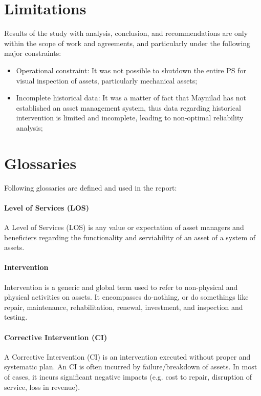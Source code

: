 \section{Limitations}
Results of the study with analysis, conclusion, and recommendations are only within the scope of work and agreements, and particularly under the following major constraints:
\begin{itemize}
\item Operational constraint: It was not possible to shutdown the entire PS for visual inspection of assets, particularly mechanical assets;
\item Incomplete historical data: It was a matter of fact that Maynilad has not established an asset management system, thus data regarding historical intervention is limited and incomplete, leading to non-optimal reliability analysis; 
\end{itemize}



\section{Glossaries}
Following glossaries are defined and used in the report:

\paragraph{\textbf{Level of Services (LOS)}}
A Level of Services (LOS) is any value or expectation of asset managers and beneficiers regarding the functionality and serviability of an asset of a system of assets.

\paragraph{\textbf{Intervention}}
Intervention is a generic and global term used to refer to non-physical and physical activities on assets. It encompasses do-nothing, or do somethings like repair, maintenance, rehabilitation, renewal, investment, and inspection and testing.

\paragraph{\textbf{Corrective Intervention (CI)}}
A Corrective Intervention (CI) is an intervention executed without proper and systematic plan. An CI is often incurred by failure/breakdown of assets. In most of cases, it incurs significant negative impacts (e.g. cost to repair, disruption of service, loss in revenue).

